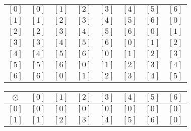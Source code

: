 \begin{enumerate}
\begin{enumerate}
\begin{tabular}{ c | c  c  c  c  c  c  c}
$\left[ 0 \right]$ & $\left[ 0 \right]$ & $\left[ 1 \right]$ & $\left[ 2 \right]$ & 
$\left[ 3 \right]$ & $\left[ 4 \right]$ & $\left[ 5 \right]$ & $\left[ 6 \right]$  \\ 

$\left[ 1 \right]$ & $\left[ 1 \right]$ & $\left[ 2 \right]$ & $\left[ 3 \right]$ & 
$\left[ 4 \right]$ & $\left[ 5 \right]$ & $\left[ 6 \right]$ & $\left[ 0 \right]$  \\ 

$\left[ 2 \right]$ & $\left[ 2 \right]$ & $\left[ 3 \right]$ & $\left[ 4 \right]$ & 
$\left[ 5 \right]$ & $\left[ 6 \right]$ & $\left[ 0 \right]$ & $\left[ 1 \right]$  \\ 

$\left[ 3 \right]$ & $\left[ 3 \right]$ & $\left[ 4 \right]$ & $\left[ 5 \right]$ & 
$\left[ 6 \right]$ & $\left[ 0 \right]$ & $\left[ 1 \right]$ & $\left[ 2 \right]$ \\ 

$\left[ 4 \right]$ & $\left[ 4 \right]$ & $\left[ 5 \right]$ & $\left[ 6 \right]$ & 
$\left[ 0 \right]$ & $\left[ 1 \right]$ & $\left[ 2 \right]$ & $\left[ 3 \right]$  \\ 

$\left[ 5 \right]$ & $\left[ 5 \right]$ & $\left[ 6 \right]$ & $\left[ 0 \right]$ & 
$\left[ 1 \right]$ & $\left[ 2 \right]$ & $\left[ 3 \right]$ & $\left[ 4 \right]$  \\ 

$\left[ 6 \right]$ & $\left[ 6 \right]$ & $\left[ 0 \right]$ & $\left[ 1 \right]$ & 
$\left[ 2 \right]$ & $\left[ 3 \right]$ & $\left[ 4 \right]$ & $\left[ 5 \right]$  \\ 
\end{tabular}

\vskip 9pt

\begin{tabular}{ c | c  c  c  c  c  c  c}
$\odot$ & $\left[ 0 \right]$ & $\left[ 1 \right]$ & $\left[ 2 \right]$ & $\left[ 3 \right]$ & 
$\left[ 4 \right]$ & $\left[ 5 \right]$ & $\left[ 6 \right]$  \\ \hline

$\left[ 0 \right]$ & $\left[ 0 \right]$ & $\left[ 0 \right]$ & $\left[ 0 \right]$ & 
$\left[ 0 \right]$ & $\left[ 0 \right]$ & $\left[ 0 \right]$ & $\left[ 0 \right]$  \\ 

$\left[ 1 \right]$ & $\left[ 1 \right]$ & $\left[ 2 \right]$ & $\left[ 3 \right]$ & 
$\left[ 4 \right]$ & $\left[ 5 \right]$ & $\left[ 6 \right]$ & $\left[ 0 \right]$  \\ 


\end{tabular}
\end{enumerate}
\end{enumerate}
